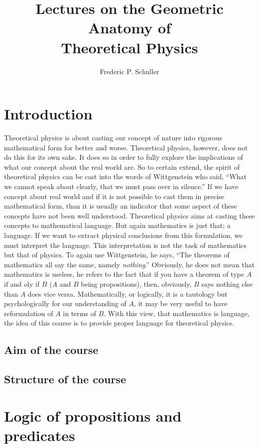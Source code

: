 \documentclass{article}
\title{Lectures on the Geometric Anatomy of\\Theoretical Physics}
\author{Frederic P. Schuller}
\date{}
\begin{document}
\maketitle
\newpage
\tableofcontents

\section*{Introduction}
Theoretical physics is about casting our concept of nature into rigorous mathematical form for better and worse. Theoretical physics, however, does not do this for its own sake. It does so in order to fully explore the implications of what our concept about the real world are. So to certain extend, the spirit of theoretical physics can be cast into the words of Wittgenstein who said, ``What we cannot speak about clearly, that we must pass over in silence.'' If we have concept about real world and if it is not possible to cast them in precise mathematical form, than it is usually an indicator that some aspect of these concepts have not been well understood. Theoretical physics aims at casting these concepts to mathematical language. But again mathematics is just that; a language. If we want to extract physical conclusions from this formulation, we must interpret the language. This interpretation is not the task of mathematics but that of physics. To again use Wittgenstein, he says, ``The theorems of mathematics all say the same, namely \textit{nothing}.'' Obviously, he does not mean that mathematics is useless, he refers to the fact that if you have a theorem of type $A$ if and oly if $B$ ($A$ and $B$ being propositions), then, obviously, $B$ says nothing else than $A$ does vice versa. Mathematically, or logically, it is a tautology but psychologically for our understanding of $A$, it may be very useful to have reformulation of $A$ in terms of $B$. With this view, that mathematics is language, the idea of this course is to provide proper language for theoretical physics. 
 
\subsection*{Aim of the course}
\subsection*{Structure of the course}

\section{Logic of propositions and predicates}
\end{document}
